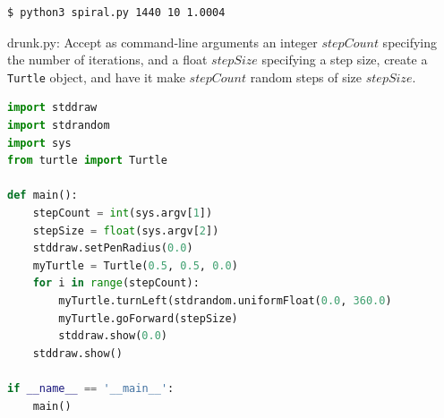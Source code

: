 \documentclass[8pt,a4paper,compress]{beamer}
\begin{document}
\begin{frame}[fragile]
\begin{minipage}{200pt}
\begin{lstlisting}[language={},style=focusin]
$ python3 spiral.py 1440 10 1.0004
\end{lstlisting}
\end{minipage}%
\hfill
\begin{minipage}{100pt}
\begin{center}
\end{center}
\end{minipage}
\end{frame}

\begin{frame}[fragile]
\pause

\begin{framed}
\tiny drunk.py: Accept as command-line arguments an integer $stepCount$ specifying the number of iterations, and a float $stepSize$ specifying a step size, create a \lstinline{Turtle} object, and have it make $stepCount$ random steps of size $stepSize$.
\end{framed}

\begin{lstlisting}[language=python,style=focusin]
import stddraw
import stdrandom
import sys
from turtle import Turtle

def main():
    stepCount = int(sys.argv[1])
    stepSize = float(sys.argv[2])
    stddraw.setPenRadius(0.0)
    myTurtle = Turtle(0.5, 0.5, 0.0)
    for i in range(stepCount):
        myTurtle.turnLeft(stdrandom.uniformFloat(0.0, 360.0)
        myTurtle.goForward(stepSize)
        stddraw.show(0.0)
    stddraw.show()

if __name__ == '__main__':
    main()
\end{lstlisting}
\end{frame}
\end{document}
